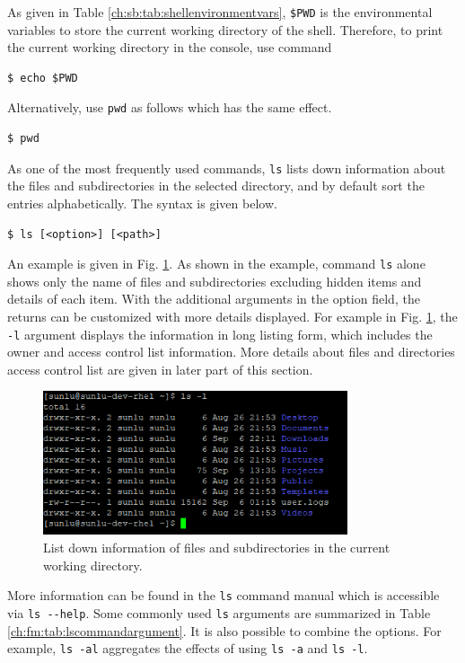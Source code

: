 As given in Table \ref{ch:sb:tab:shellenvironmentvars}, \verb|$PWD| is the environmental variables to store the current working directory of the shell. Therefore, to print the current working directory in the console, use command 
\begin{lstlisting}
$ echo $PWD
\end{lstlisting}
Alternatively, use \verb|pwd| as follows which has the same effect.
\begin{lstlisting}
$ pwd
\end{lstlisting}

As one of the most frequently used commands, \verb|ls| lists down information about the files and subdirectories in the selected directory, and by default sort the entries alphabetically. The syntax is given below.
\begin{lstlisting}
$ ls [<option>] [<path>]
\end{lstlisting}

An example is given in Fig. \ref{ch:fm:fig:lscommandexample}. As shown in the example, command \verb|ls| alone shows only the name of files and subdirectories excluding hidden items and details of each item. With the additional arguments in the option field, the returns can be customized with more details displayed. For example in Fig. \ref{ch:fm:fig:lscommandexample}, the \verb|-l| argument displays the information in long listing form, which includes the owner and access control list information. More details about files and directories access control list are given in later part of this section.

\begin{figure}[!htb]
	\centering
	\includegraphics[width=0.8\textwidth]{chapters/part-1/figures/ls_command_example.png}
	\caption{List down information of files and subdirectories in the current working directory.} \label{ch:fm:fig:lscommandexample}
\end{figure}

More information can be found in the \verb|ls| command manual which is accessible via \verb|ls --help|. Some commonly used \verb|ls| arguments are summarized in Table \ref{ch:fm:tab:lscommandargument}. It is also possible to combine the options. For example, \verb|ls -al| aggregates the effects of using \verb|ls -a| and \verb|ls -l|.

